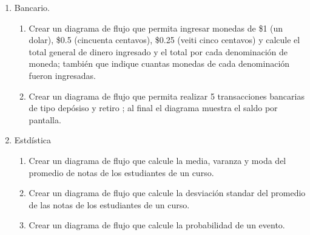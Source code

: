 \documentclass[a4paper,12pt,spanish]{article}
\begin{document}
\begin{enumerate}
\item Bancario.
  \begin{enumerate}

  \item   Crear un diagrama de flujo que permita ingresar monedas de \$1 (un dolar), \$0.5 (cincuenta centavos), \$0.25 (veiti cinco centavos) y  calcule el total general de dinero ingresado y el total por cada denominación de moneda; también que indique cuantas monedas de cada denominación fueron ingresadas.
  
  \item Crear un diagrama de flujo que permita realizar 5 transacciones bancarias de tipo depósiso y retiro ; al final el diagrama muestra el saldo por pantalla. 
  \end{enumerate}

\item Estdística
  \begin{enumerate}
  \item Crear un diagrama de flujo que calcule la media, varanza y moda del promedio de notas de los estudiantes de un curso. 
  \item Crear un diagrama de flujo que calcule la desviación standar del promedio de las notas de los estudiantes de un curso.
  \item Crear un diagrama de flujo que calcule la probabilidad de un evento.
  \end{enumerate}
  

\end{enumerate}
\end{document}
